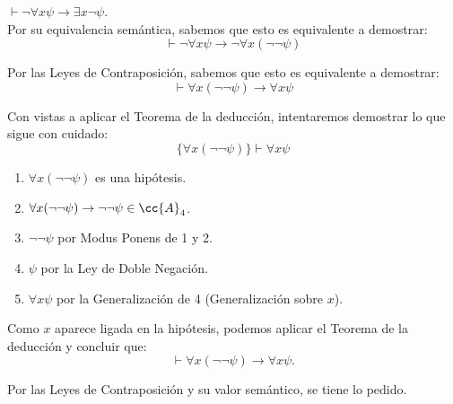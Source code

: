 \begin{ejercicio}\label{ej:2.10}
    $\vdash \neg \forall x \psi \rightarrow \exists x \neg \psi$.\\

    Por su equivalencia semántica, sabemos que esto es equivalente a demostrar:
    \begin{equation*}
        \vdash \neg \forall x \psi \rightarrow \neg\forall x(\neg\neg\psi)
    \end{equation*}

    Por las Leyes de Contraposición, sabemos que esto es equivalente a demostrar:
    \begin{equation*}
        \vdash \forall x(\neg\neg\psi) \rightarrow \forall x \psi
    \end{equation*}

    Con vistas a aplicar el Teorema de la deducción, intentaremos demostrar lo que sigue con cuidado:
    \begin{equation*}
        \{\forall x(\neg\neg\psi)\} \vdash \forall x \psi
    \end{equation*}
    \begin{enumerate}
        \item $\forall x(\neg\neg\psi)$ es una hipótesis.
        \item $\forall x(\neg\neg\psi) \rightarrow \neg\neg\psi\in \cc{A}_4$.
        \item $\neg\neg\psi$ por Modus Ponens de 1 y 2.
        \item $\psi$ por la Ley de Doble Negación.
        \item $\forall x\psi$ por la Generalización de 4 \qquad (Generalización sobre $x$).
    \end{enumerate}

    Como $x$ aparece ligada en la hipótesis, podemos aplicar el Teorema de la deducción y concluir que:
    \begin{equation*}
        \vdash \forall x(\neg\neg\psi) \rightarrow \forall x \psi.
    \end{equation*}

    Por las Leyes de Contraposición y su valor semántico, se tiene lo pedido.
\end{ejercicio}

